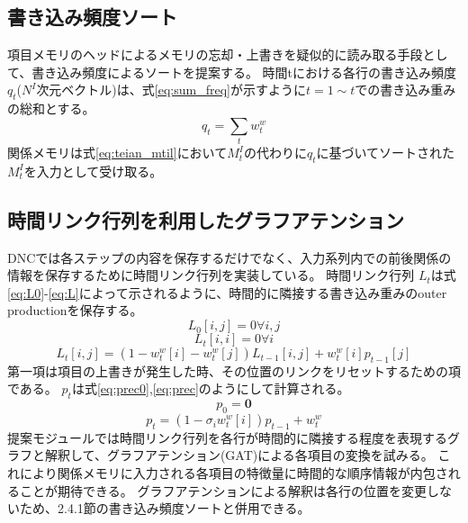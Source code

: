 \subsection{書き込み頻度ソート}
項目メモリのヘッドによるメモリの忘却・上書きを疑似的に読み取る手段として、書き込み頻度によるソートを提案する。
時間tにおける各行の書き込み頻度$q_t$($N^I$次元ベクトル)は、式\ref{eq:sum_freq}が示すように$t=1\sim t$での書き込み重みの総和とする。
\begin{equation}\label{eq:sum_freq}
	q_t =\sum_t w^w_t
\end{equation}
関係メモリは式\ref{eq:teian_mtil}において$M^I_t$の代わりに$q_t$に基づいてソートされた$M^I_t$を入力として受け取る。

\subsection{時間リンク行列を利用したグラフアテンション}
DNC\cite{dnc}では各ステップの内容を保存するだけでなく、入力系列内での前後関係の情報を保存するために時間リンク行列を実装している。
時間リンク行列 $L_t$は式\ref{eq:L0}-\ref{eq:L}によって示されるように、時間的に隣接する書き込み重みのouter productionを保存する。
\begin{equation}\label{eq:L0}
	L_0[i,j] =0 \forall i,j
\end{equation}
\begin{equation}\label{eq:Ltii}
	L_t[i,i] =0 \forall i
\end{equation}
\begin{equation}\label{eq:L}
	L_t[i,j] =(1-w^w_t[i]-w^w_t[j])L_{t-1}[i,j]+w^w_t[i]p_{t-1}[j]
\end{equation}
第一項は項目の上書きが発生した時、その位置のリンクをリセットするための項である。
$p_t$は式\ref{eq:prec0},\ref{eq:prec}のようにして計算される。
\begin{equation}\label{eq:prec0}
	p_0 =\boldsymbol{0}
\end{equation}
\begin{equation}\label{eq:prec}
	p_t =(1-\sigma_iw^w_t[i]) p_{t-1}+w^w_t
\end{equation}
提案モジュールでは時間リンク行列を各行が時間的に隣接する程度を表現するグラフと解釈して、グラフアテンション(GAT)\cite{gat}による各項目の変換を試みる。
これにより関係メモリに入力される各項目の特徴量に時間的な順序情報が内包されることが期待できる。
グラフアテンションによる解釈は各行の位置を変更しないため、2.4.1節の書き込み頻度ソートと併用できる。


